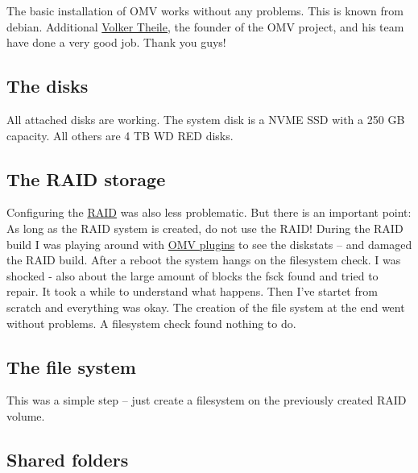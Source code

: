 The basic installation of \gls{OMV} works without any problems. This is known
from debian. Additional \href{https://www.openmediavault.org/?page_id=1206}{Volker Theile},
the founder of the \gls{OMV} project, and his team have done a very good job.
Thank you guys!


\subsection{The disks}

All attached disks are working. The system disk is a NVME SSD with a 250 GB
capacity. All others are 4 TB WD RED disks.


\subsection{The RAID storage}

Configuring the \href{https://en.wikipedia.org/wiki/RAID}{RAID} was also less
problematic. But there is an important point: As long as the RAID system is
created, do not use the RAID! During the RAID build I was playing around with
\href{https://www.openmediavault.org/?page_id=2014}{OMV plugins} to see the
diskstats -- and damaged the RAID build. After a reboot the system hangs on
the filesystem check. I was shocked - also about the large amount of blocks
the fsck found and tried to repair. It took a while to understand what happens.
Then I've startet from scratch and everything was okay. The creation of the
file system at the end went without problems. A filesystem check found nothing
to do.


\subsection{The file system}

This was a simple step -- just create a filesystem on the previously created
RAID volume.


\subsection{Shared folders}\label{subsec:Shared folders}


